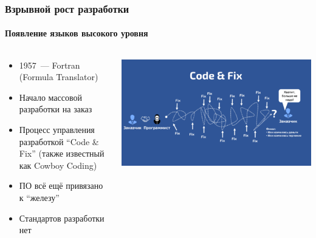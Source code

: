 \documentclass{../../slides-style}
\begin{document}
    \begin{frame}
        \frametitle{Взрывной рост разработки}
        \framesubtitle{Появление языков высокого уровня}
        \begin{columns}
            \begin{column}{0.5\textwidth}
                \begin{itemize}
                    \item 1957~--- Fortran (Formula Translator)
                    \item Начало массовой разработки на заказ
                    \item Процесс управления разработкой ``Code \& Fix'' (также известный как Cowboy Coding)
                    \item ПО всё ещё привязано к ``железу''
                    \item Стандартов разработки нет
                \end{itemize}
            \end{column}
            \begin{column}{0.5\textwidth}
                \begin{center}
                    \includegraphics[width=\textwidth]{codeAndFix.png}
                \end{center}
            \end{column}
        \end{columns}
    \end{frame}
\end{document}
